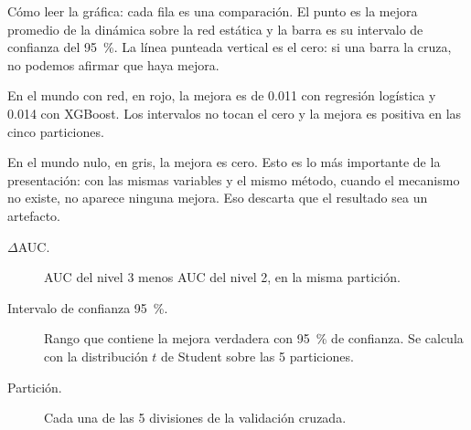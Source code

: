 \begin{decir}
Cómo leer la gráfica: cada fila es una comparación. El punto es la mejora promedio de la
dinámica sobre la red estática y la barra es su intervalo de confianza del 95~\%. La
línea punteada vertical es el cero: si una barra la cruza, no podemos afirmar que haya
mejora.

En el mundo con red, en rojo, la mejora es de 0.011 con regresión logística y 0.014 con
XGBoost. Los intervalos no tocan el cero y la mejora es positiva en las cinco
particiones.

En el mundo nulo, en gris, la mejora es cero. Esto es lo más importante de la
presentación: con las mismas variables y el mismo método, cuando el mecanismo no existe,
no aparece ninguna mejora. Eso descarta que el resultado sea un artefacto.
\end{decir}
\begin{terminos}
\begin{description}
\item[$\Delta$AUC.] AUC del nivel 3 menos AUC del nivel 2, en la misma partición.
\item[Intervalo de confianza 95~\%.] Rango que contiene la mejora verdadera con 95~\% de
confianza. Se calcula con la distribución $t$ de Student sobre las 5 particiones.
\item[Partición.] Cada una de las 5 divisiones de la validación cruzada.
\end{description}
\end{terminos}
\begin{preguntas}
\end{preguntas}

